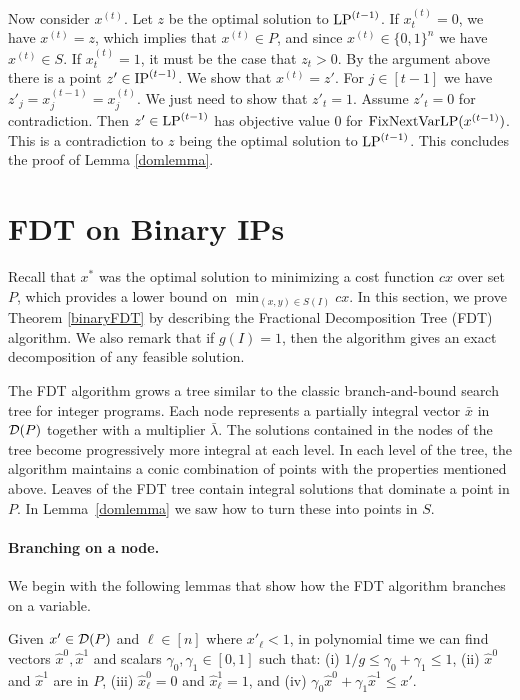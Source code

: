 Now consider $x^{(t)}$. Let $z$ be the optimal solution to $\operatorname{LP}^{(t-1)}$. If $x^{(t)}_t = 0$, we have $x^{(t)} = z$, which implies that $x^{(t)}\in P$, and since $x^{(t)}\in \{0,1\}^n$ we have $x^{(t)}\in S$. If $x^{(t)}_t =1$, it must be the case that $z_t > 0$. By the argument above there is a point $z'\in \operatorname{IP}^{(t-1)}$. We show that $x^{(t)} = z'$. For $j\in [t-1]$ we have $z'_j= x_j^{(t-1)}=x_j^{(t)}$. We just need to show that $z'_t = 1$. Assume $z'_t	 = 0$ for contradiction. Then $z'\in \operatorname{LP}^{(t-1)}$ has objective value $0$ for $\operatorname{{{FixNextVarLP}}}(x^{(t-1)})$. This is a contradiction to $z$ being the optimal solution to $\operatorname{LP}^{(t-1)}$. This concludes the proof of Lemma \ref{domlemma}. 



\section{FDT on Binary IPs}
\label{sec:binaryfdt}
Recall that $x^*$ was the optimal solution to minimizing a cost function $cx$ over set $P$, which provides a lower bound on $\min_{(x,y)\in S(I)} cx$.  In this section, we prove Theorem \ref{binaryFDT} by describing the Fractional Decomposition Tree (FDT) algorithm. We also remark that if $g(I)=1$, then the algorithm gives an exact decomposition of any feasible solution. 


The FDT algorithm grows a tree similar to the classic branch-and-bound search tree for integer programs. Each node represents a partially integral vector $\bar{x}$ in $\operatorname{\mathcal{D}}(P)$ together with a multiplier $\bar{\lambda}$. The solutions contained in the nodes of the tree become progressively more integral at each level. In each level of the tree, the algorithm maintains a conic combination of points with the properties mentioned above. Leaves of the FDT tree contain integral solutions
that dominate a point in $P$. In Lemma~\ref{domlemma} we saw how to turn these into points in $S$. 

\paragraph{Branching on a node.}
We begin with the following lemmas that show how the FDT algorithm branches on a variable.
\begin{lemma}\label{LPClemma}
	Given $x'\in \operatorname{\mathcal{D}}(P)$ and $\ell\in [n]$ where $x'_{\ell}<1$, in polynomial time we can find vectors $\hat{x}^0,\hat{x}^1$ and scalars $\gamma_0,\gamma_1 \in [0,1]$ such that: (i) $1/g \leq \gamma_0 + \gamma_1  \leq 1$, (ii) $\hat{x}^0$ and $\hat{x}^1$ are in  $ P$, (iii) $\hat{x}^0_\ell=0$ and $\hat{x}^1_\ell=1$, and (iv) $\gamma_0 \hat{x}^0 + \gamma_1\hat{x}^1 \leq x'$.
\end{lemma}


